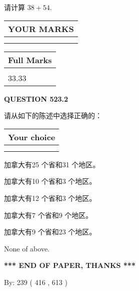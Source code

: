 \documentclass{ctexart}
\begin{document}
  
 
请计算 $ %
38 +  %
54 $.
 

 

 
  
\vspace{0.2in}
  
\noindent\begin{tabular}{|l|}
\hline
 YOUR MARKS  \\
\hline
 \\ 
 \\ 
\hline
\end{tabular}
\hspace{0.05in} \begin{tabular}{|l|}
\hline
 Full Marks  \\
\hline
 \\ 
33.33 \\
\hline
\end{tabular}
{\textbf{\Large{QUESTION
523.2 
}}}
  
  
请从如下的陈述中选择正确的：
  
  
\noindent\hspace{3.0in} \begin{tabular}{|l|}
\hline
Your choice \\
\hline
 \\ 
 \\ 
\hline
\end{tabular}
  
  
 
 
加拿大有25 个省和31 个地区。
 
 
加拿大有10 个省和3 个地区。
 
 
加拿大有12 个省和3 个地区。
 
 
加拿大有7 个省和9 个地区。
 
 
加拿大有9 个省和23 个地区。
 
 
 None of above.
 
 
   
   
 \vspace{0.2in}
 
   
   
   
   
\vspace{1.0in} 
{\textbf{\large{ *** END OF PAPER, THANKS *** }}} 
   
   
\hspace{1.0in} By: 
 239 ( 416 ,  613 )
   
\end{document}
